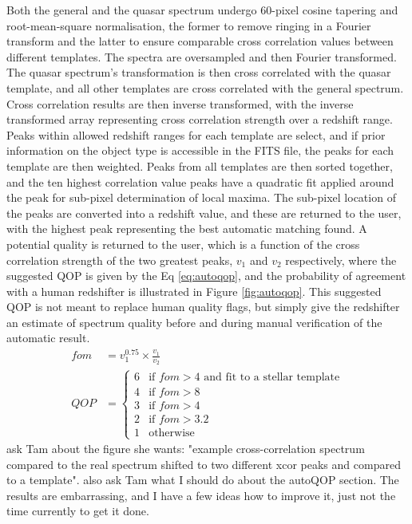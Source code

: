 \documentclass[iop]{emulateapj}
\newcommand{\green}{\color{LimeGreen}}
\begin{document}
Both the general and the quasar spectrum undergo 60-pixel cosine tapering and root-mean-square normalisation, the former to remove ringing in a Fourier transform and the latter to ensure comparable cross correlation values between different templates. The spectra are oversampled and then Fourier transformed. The quasar spectrum's transformation is then cross correlated with the quasar template, and all other templates are cross correlated with the general spectrum. Cross correlation results are then inverse transformed, with the inverse transformed array representing cross correlation strength over a redshift range. Peaks within allowed redshift ranges for each template are select, and if prior information on the object type is accessible in the FITS file, the peaks for each template are then weighted. Peaks from all templates are then sorted together, and the ten highest correlation value peaks have a quadratic fit applied around the peak for sub-pixel determination of local maxima. The sub-pixel location of the peaks are converted into a redshift value, and these are returned to the user, with the highest peak representing the best automatic matching found. A potential quality is returned to the user, which is a function of the cross correlation strength of the two greatest peaks, $v_1$ and $v_2$ respectively, where the suggested QOP is given by the Eq \eqref{eq:autoqop}, and the probability of agreement with a human redshifter is illustrated in Figure \ref{fig:autoqop}. This suggested QOP is not meant to replace human quality flags, but simply give the redshifter an estimate of spectrum quality before and during manual verification of the automatic result.
\begin{align}
fom &= v_1^{0.75} \times \frac{v_1}{v_2} \\
QOP &= \begin{cases}6 & \text{if } fom > 4 \text{ and fit to a stellar template} \label{eq:autoqop}\\
4 & \text{if } fom > 8  \\
3 & \text{if } fom > 4 \\
2 & \text{if } fom > 3.2 \\
1 & \text{otherwise} \end{cases}
\end{align}
{\green ask Tam about the figure she wants: "example cross-correlation spectrum compared to the real spectrum shifted to two different xcor peaks and compared to a template". also ask Tam what I should do about the autoQOP section. The results are embarrassing, and I have a few ideas how to improve it, just not the time currently to get it done. }
\end{document}
